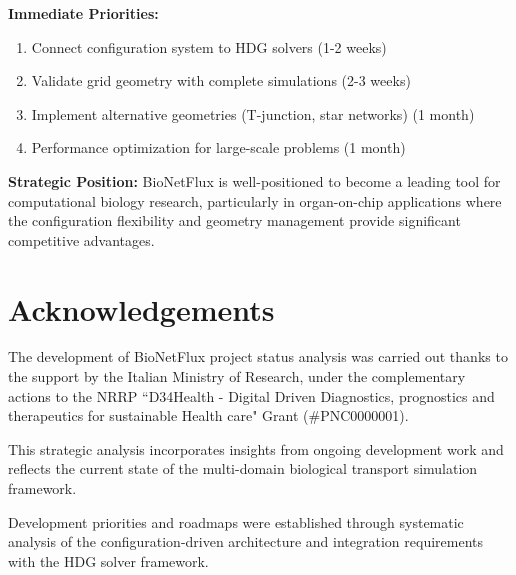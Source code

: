 \documentclass[11pt,a4paper]{article}
\begin{document}
\begin{progressbox}
\textbf{Immediate Priorities:}
\begin{enumerate}
    \item Connect configuration system to HDG solvers (1-2 weeks)
    \item Validate grid geometry with complete simulations (2-3 weeks)  
    \item Implement alternative geometries (T-junction, star networks) (1 month)
    \item Performance optimization for large-scale problems (1 month)
\end{enumerate}

\textbf{Strategic Position:} BioNetFlux is well-positioned to become a leading tool for computational biology research, particularly in organ-on-chip applications where the configuration flexibility and geometry management provide significant competitive advantages.
\end{progressbox}

\vspace*{\fill}

\clearpage

\tableofcontents
\clearpage

\section*{Acknowledgements}

The development of BioNetFlux project status analysis was carried out thanks to the support by the Italian Ministry of Research, under the complementary actions to the NRRP ``D34Health - Digital Driven Diagnostics, prognostics and therapeutics for sustainable Health care" Grant (\#PNC0000001).

This strategic analysis incorporates insights from ongoing development work and reflects the current state of the multi-domain biological transport simulation framework.

Development priorities and roadmaps were established through systematic analysis of the configuration-driven architecture and integration requirements with the HDG solver framework.

\clearpage




\end{document}
